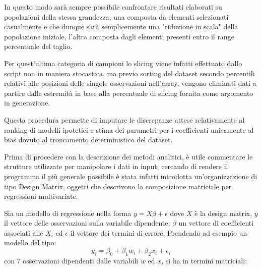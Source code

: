 \documentclass[a4paper]{report}
\begin{document}
In questo modo sarà sempre possibile confrontare risultati elaborati su popolazioni della stessa grandezza, una composta da elementi selezionati casualmente e che dunque sarà semplicemente una "riduzione in scala" della popolazione iniziale, l'altra composta dagli elementi presenti entro il range percentuale del taglio.

Per quest'ultima categoria di campioni lo slicing viene infatti effettuato dallo script non in maniera stocastica, ma previo sorting del dataset secondo percentili relativi alle posizioni delle singole osservazioni nell'array, vengono eliminati dati a partire dalle estremità in base alla percentuale di slicing fornita come argomento in generazione.

Questa procedura permette di imputare le discrepanze attese relativamente al ranking di modelli ipotetici e stima dei parametri per i coefficienti unicamente al bias dovuto al troncamento deterministico del dataset.

Prima di procedere con la descrizione dei metodi analitici, è utile commentare le strutture utilizzate per manipolare i dati in input; cercando di rendere il programma il più generale possibile è stata infatti introdotta un'organizzazione di tipo Design Matrix, oggetti che descrivono la  composizione matriciale per regressioni multivariate.

Sia un modello di regressione nella forma $y=X\beta+\epsilon$ dove $X$ è la design matrix, $y$ il vettore delle osservazioni sulla variabile dipendente, $\beta$ un vettore di coefficienti associati alle $X_i$ ed $\epsilon $ il vettore dei termini di errore.
Prendendo ad esempio un modello del tipo:
\[y_i = \beta_0 + \beta_1 w_i + \beta_2 x_i + \epsilon_i \]
con 7 osservazioni dipendenti dalle variabili $w$ ed $x$, si ha in termini matriciali:
\end{document}
